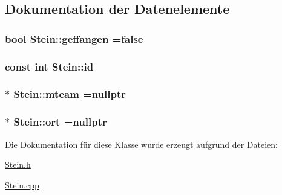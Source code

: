 \subsection{Dokumentation der Datenelemente}
\hypertarget{class_stein_a4151b35edce6df36a415536c9fd0d247}{}
\subsubsection[{geffangen}]{\setlength{\rightskip}{0pt plus 5cm}bool Stein\+::geffangen =false\hspace{0.3cm}{\ttfamily [protected]}}\label{class_stein_a4151b35edce6df36a415536c9fd0d247}
\hypertarget{class_stein_ab8a179db9a227d710ce7d236ecae37ee}{}
\subsubsection[{id}]{\setlength{\rightskip}{0pt plus 5cm}const int Stein\+::id\hspace{0.3cm}{\ttfamily [protected]}}\label{class_stein_ab8a179db9a227d710ce7d236ecae37ee}
\hypertarget{class_stein_ae2b58e289026a8afaf8e22f8b9ad3d9c}{}
\subsubsection[{mteam}]{$\ast$ Stein\+::mteam =nullptr\hspace{0.3cm}{\ttfamily [protected]}}\label{class_stein_ae2b58e289026a8afaf8e22f8b9ad3d9c}
\hypertarget{class_stein_aee940baa567743384754215cbdb5657d}{}
\subsubsection[{ort}]{$\ast$ Stein\+::ort =nullptr\hspace{0.3cm}{\ttfamily [protected]}}\label{class_stein_aee940baa567743384754215cbdb5657d}


Die Dokumentation für diese Klasse wurde erzeugt aufgrund der Dateien\+:\begin{DoxyCompactItemize}
\item 
\hyperlink{_stein_8h}{Stein.\+h}\item 
\hyperlink{_stein_8cpp}{Stein.\+cpp}\end{DoxyCompactItemize}
